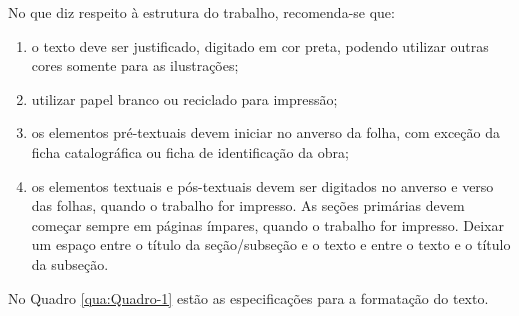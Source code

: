 \documentclass[
	12pt,				%
	oneside,			%
	a4paper,			%
	chapter=TITLE,		%
	section=TITLE,		%
	english,			%
	brazil				%
	]{abntex2}
\begin{document}
No que diz respeito à estrutura do trabalho, recomenda-se que:
\begin{enumerate}
\def\labelenumi{\alph{enumi}.}
\tightlist
\item
  o texto deve ser justificado, digitado em cor preta, podendo utilizar outras
  cores somente para as ilustrações;
\item
  utilizar papel branco ou reciclado para impressão;
\item
  os elementos pré-textuais devem iniciar no anverso da folha, com exceção da
  ficha catalográfica ou ficha de identificação da obra;
\item
  os elementos textuais e pós-textuais devem ser digitados no anverso e verso
  das folhas, quando o trabalho for impresso. As seções primárias devem começar
  sempre em páginas ímpares, quando o trabalho for impresso. Deixar um espaço
  entre o título da seção/subseção e o texto e entre o texto e o título da subseção.
\end{enumerate}
No Quadro \ref{qua:Quadro-1} estão as especificações para a formatação do texto.
\end{document}
